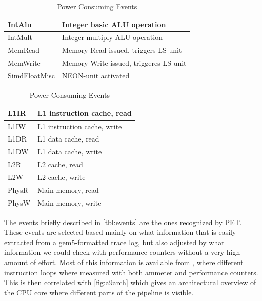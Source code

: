\begin{table}[ht]
    \centering
    \begin{minipage}[b]{\linewidth}
        \centering
        \begin{tabular}{|l|l|}
            \hline
            IntAlu    & Integer basic ALU operation\\
            \hline
            IntMult    & Integer multiply ALU operation \\
            \hline
            MemRead    & Memory Read issued, triggers LS-unit \\
            \hline
            MemWrite    & Memory Write issued, triggeres LS-unit \\
            \hline
            SimdFloatMisc     & NEON-unit activated \\
            \hline
        \end{tabular}
    \end{minipage}

    \begin{minipage}[b]{\linewidth}
        \centering
        \begin{tabular}{|l|l|}
            \hline
            L1IR    & L1 instruction cache, read \\
            \hline
            L1IW    & L1 instruction cache, write \\
            \hline
            L1DR    & L1 data cache, read \\
            \hline
            L1DW    & L1 data cache, write \\
            \hline
            L2R     & L2 cache, read \\
            \hline
            L2W     & L2 cache, write \\
            \hline
            PhysR   & Main memory, read \\
            \hline
            PhysW   & Main memory, write \\
            \hline
        \end{tabular}
    \end{minipage}
    \caption{Power Consuming Events}
    \label{tbl:events}
\end{table}

The events briefly described in \autoref{tbl:events} are the ones recognized by
PET. These events are selected based mainly on what information that is easily
extracted from a gem5-formatted trace log, but also adjusted by what information
we could check with performance counters without a very high amount of effort.
Most of this information is available from \cite{rundehvatum2013exploring},
where different instruction loops where measured with both ammeter and
performance counters. This is then correlated with \autoref{fig:a9arch} which
gives an architectural overview of the CPU core where different parts of the
pipeline is visible.

